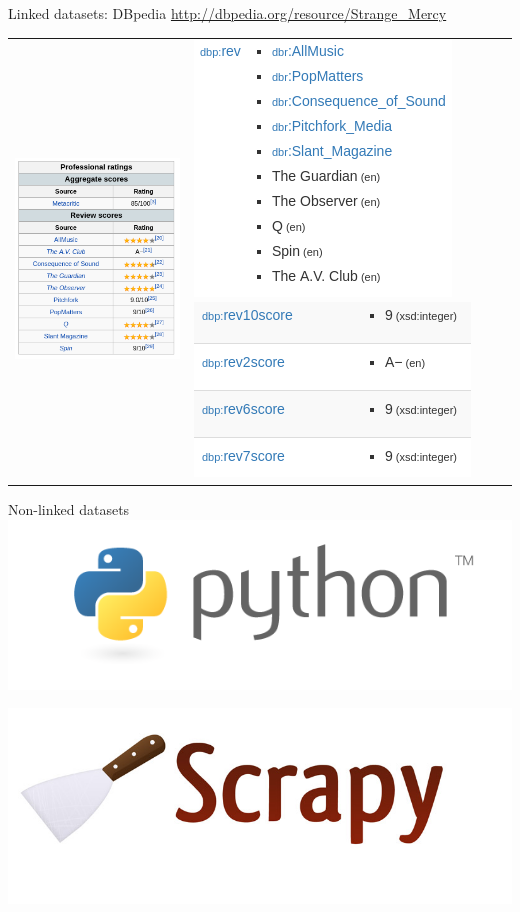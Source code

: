 \documentclass{beamer}
\begin{document}
\begin{frame}{Linked datasets: DBpedia}
\url{http://dbpedia.org/resource/Strange_Mercy}
\vspace{1cm}

\begin{tabular}{l|l}
\includegraphics[width=.32\textwidth]{strange_mercy2.png}
&
\includegraphics[width=.32\textwidth]{dbpedia2a.png}
\includegraphics[width=.32\textwidth]{dbpedia2b.png}
\end{tabular}
\end{frame}

\begin{frame}{Non-linked datasets}
\centering
\includegraphics[width=\textwidth]{python-logo-master-v3-TM.png}

\centering
\includegraphics[width=\textwidth]{scrapy-logo.jpg}
\end{frame}
\end{document}
